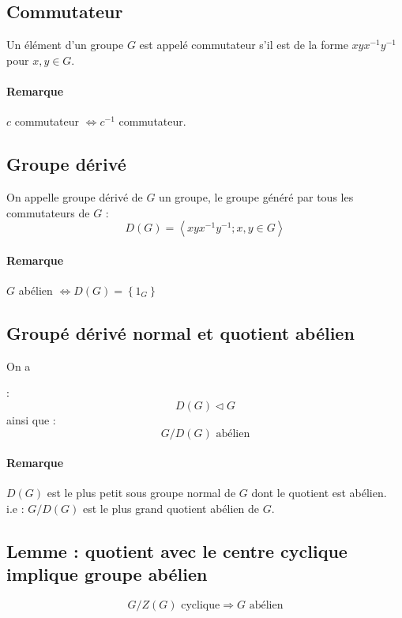 \documentclass[a4paper,10pt]{report}
\newcommand{\grp}[1]{\left\langle #1 \right\rangle} %
\newcommand{\set}[1]{\left\lbrace #1 \right\rbrace } %
\newcommand{\so}{\Rightarrow}
\newcommand{\mfootnote}[1]{\up{(}\footnote{#1}\up{)}}
\begin{document}
   \subsection{Commutateur}
    Un élément d'un groupe $G$ est appelé commutateur s'il est de la forme
    $xyx^{-1}y^{-1}$ pour $x,y \in G$.

    \paragraph{Remarque} $c$ commutateur $\iff c^{-1}$ commutateur.

   \subsection{Groupe dérivé}
    On appelle groupe dérivé de $G$ un groupe, le groupe généré
    par tous les commutateurs de $G$ :
    $$D(G)=\grp{xyx^{-1}y^{-1}; x,y \in G}$$

    \paragraph{Remarque} $G$ abélien $\iff D(G)=\set{1_G}$ 

   \subsection{Groupé dérivé normal et quotient abélien}
    On a
    \begin{comment}
      \mfootnote{Preuve : 15/10/08 p2 verso} 
    \end{comment}
    : $$D(G) \triangleleft G$$
    ainsi que : $$G/D(G) \text{ abélien}$$

    \paragraph{Remarque} $D(G)$ est le plus petit sous groupe normal de $G$ dont
    le quotient est abélien.\\
    i.e : $G/D(G)$ est le plus grand quotient abélien de $G$.

   \subsection{Lemme : quotient avec le centre cyclique implique groupe abélien}
    $$G/Z(G) \text{ cyclique} \so G \text{ abélien}$$
    \begin{comment}
      \mfootnote{Preuve : CM 15/10/08 p2 verso}
    \end{comment}
\end{document}
